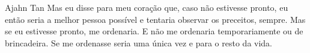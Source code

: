 
\begin{quotepage}{0.58\linewidth}{Ajahn Tan}
Mas eu disse para meu coração que, caso não estivesse pronto, eu então
seria a melhor pessoa possível e tentaria observar os preceitos,
sempre. Mas se eu estivesse pronto, me ordenaria. E não me ordenaria
temporariamente ou de brincadeira. Se me ordenasse seria uma única vez
e para o resto da vida.
\end{quotepage}

